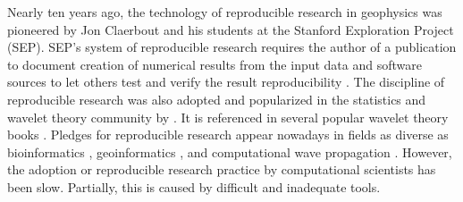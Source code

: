 \begin{comment}
The quest for peer review and reproducibility is especially important
for computational geosciences and computational geophysics in
particular. The very first paper published in \emph{Geophysics} was
titled ``Black magic in geophysical prospecting''
\cite[]{GEO01-01-00010008,TLE02-03-00280031} and presented an account
of different ``magical'' methods of oil explorations promoted by
entrepreneurs in the early days of geophysical exploration industry.
Although none of these methods exist today, it is not a secret that
industrial practice is full of nearly magical tricks, often hidden
besides a scientific appearance. Only a scrutiny of peer review and
result verification can help us distinguish magic from science and
advance the latter.
\end{comment}

Nearly ten years ago, the technology of reproducible research in
geophysics was pioneered by Jon Claerbout and his students at the
Stanford Exploration Project (SEP).  SEP's system of reproducible
research requires the author of a publication to document creation of
numerical results from the input data and software sources to let
others test and verify the result reproducibility
\cite[]{SEG-1992-0601,matt}.
The discipline of reproducible research was also adopted and
popularized in the statistics and wavelet theory community by
\cite{donoho}. It is referenced in several popular wavelet theory
books \cite[]{hubbard,mallat}. Pledges for reproducible research
appear nowadays in fields as diverse as bioinformatics
\cite[]{bioconductor}, 
geoinformatics \cite[]{geo}, and computational
wave propagation \cite[]{randy}. However, the adoption or reproducible
research practice by computational scientists has been slow.
Partially, this is caused by difficult and inadequate tools.

